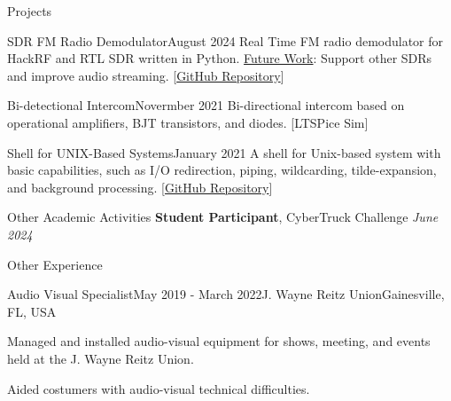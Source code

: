 \documentclass{resume} %
\begin{document}
\begin{rSection}{Projects}
\begin{rSubsection_project}{SDR FM Radio Demodulator}{August 2024}
Real Time FM radio demodulator for HackRF and RTL SDR written in Python. \underline{Future Work}: Support other SDRs and improve audio streaming. [\href{https://github.com/carguelloM/sdr-fm-radio}{GitHub Repository}]
\end{rSubsection_project}

\begin{rSubsection_project}{Bi-detectional Intercom}{Novermber 2021}
Bi-directional intercom based on operational amplifiers, BJT transistors, and diodes. [LTSPice Sim]
\end{rSubsection_project}

\begin{rSubsection_project}{Shell for UNIX-Based Systems}{January 2021}
A shell for Unix-based system with basic capabilities, such as
I/O redirection, piping, wildcarding, tilde-expansion, and background processing. [\href{https://github.com/carguelloM/CPshell}{GitHub Repository}]
\end{rSubsection_project}


\end{rSection}

\begin{rSection}{Other Academic Activities}
\textbf{Student Participant}, CyberTruck Challenge \hfill \textit{June 2024}
\end{rSection}

\begin{rSection}{Other Experience}
\begin{rSubsection}{Audio Visual Specialist}{May 2019 - March 2022}{J. Wayne Reitz Union}{Gainesville, FL, USA}
  \item Managed and installed audio-visual equipment for shows, meeting, and events held at the
J. Wayne Reitz Union.
  \item Aided costumers with audio-visual technical difficulties.
\end{rSubsection}
\end{rSection}
\end{document}
